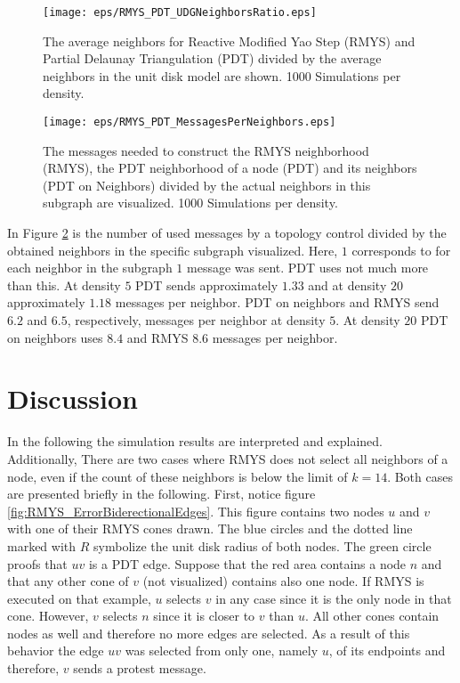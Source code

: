 \begin{figure}[h!]
\centering
\texttt{[image: eps/RMYS\_PDT\_UDGNeighborsRatio.eps]}
\caption{The average neighbors for Reactive Modified Yao Step (RMYS) and Partial Delaunay Triangulation (PDT) divided by the average neighbors in the unit disk model are shown. 1000 Simulations per density.}
\label{fig:RMYS_PDT_UDGNeighborsRatio}
\end{figure}

\begin{figure}[h!]
\centering
\texttt{[image: eps/RMYS\_PDT\_MessagesPerNeighbors.eps]}
\caption{The messages needed to construct the RMYS neighborhood (RMYS), the PDT neighborhood of a node (PDT) and its neighbors (PDT on Neighbors) divided by the actual neighbors in this subgraph are visualized. 1000 Simulations per density.}
\label{fig:RMYS_PDT_MessagesPerNeighbors}
\end{figure}

In Figure \ref{fig:RMYS_PDT_MessagesPerNeighbors} is the number of used messages by a topology control divided by the obtained neighbors in the specific subgraph visualized.
Here, $1 $ corresponds to for each neighbor in the subgraph $1 $ message was sent.
PDT uses not much more than this.
At density $5 $ PDT sends approximately $1.33$ and at density $20 $ approximately $1.18 $ messages per neighbor.
PDT on neighbors and RMYS send $6.2 $ and $6.5 $, respectively, messages per neighbor at density $5 $.
At density $20 $ PDT on neighbors uses $8.4 $ and RMYS $8.6 $ messages per neighbor.

\section{Discussion}
In the following the simulation results are interpreted and explained.
Additionally, 
There are two cases where RMYS does not select all neighbors of a node, even if the count of these neighbors is below the limit of $k=14 $.
Both cases are presented briefly in the following.
First, notice figure \ref{fig:RMYS_ErrorBiderectionalEdges}.
This figure contains two nodes $u $ and $v $ with one of their RMYS cones drawn.
The blue circles and the dotted line marked with $R $ symbolize the unit disk radius of both nodes.
The green circle proofs that $uv $ is a PDT edge.
Suppose that the red area contains a node $n $ and that any other cone of $v $ (not visualized) contains also one node.
If RMYS is executed on that example, $u $ selects $v $ in any case since it is the only node in that cone.
However, $v $ selects $n $ since it is closer to $v $ than $u $.
All other cones contain nodes as well and therefore no more edges are selected.
As a result of this behavior the edge $uv $ was selected from only one, namely $u $, of its endpoints and therefore, $v $ sends a protest message.

